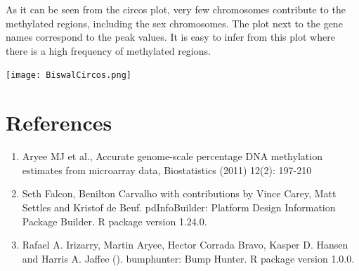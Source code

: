 \documentclass[11pt]{article}
\begin{document}
As it can be seen from the circos plot, very few chromosomes contribute to the methylated regions, including the sex chromosomes. The plot next to the gene names correspond to the peak values. It is easy to infer from this plot where there is a high frequency of methylated regions.

\texttt{[image: BiswalCircos.png]}



% 
 
% 
%
% 


\section*{References}  
\begin{enumerate}


	\item  Aryee MJ et al., Accurate genome-scale percentage DNA methylation estimates
	  from microarray data, Biostatistics (2011) 12(2): 197-210 	

	\item  Seth Falcon, Benilton Carvalho with contributions by Vince Carey, Matt
	  Settles and Kristof de Beuf. pdInfoBuilder: Platform Design Information
	  Package Builder. R package version 1.24.0.
	
	\item   Rafael A. Irizarry, Martin Aryee, Hector Corrada Bravo, Kasper D. Hansen and	Harris A. Jaffee (). bumphunter: Bump Hunter. R package version 1.0.0.
		
 \end{enumerate}

 
 
 
 
 
\end{document}
